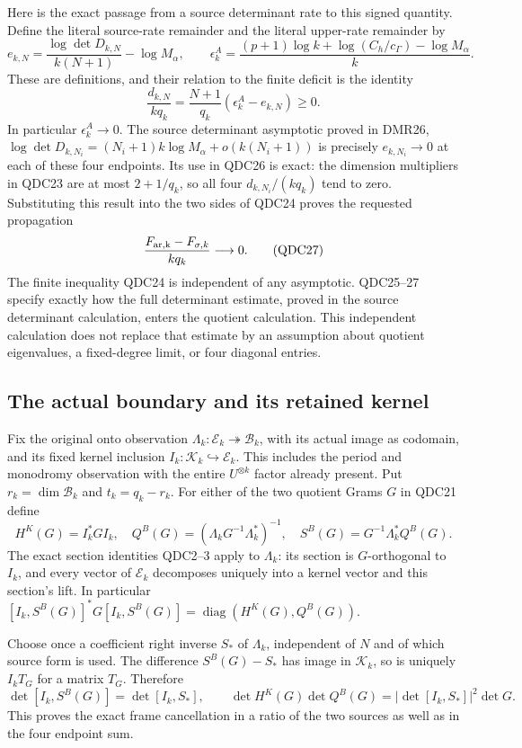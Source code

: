 Here is the exact passage from a source determinant rate to
this signed quantity. Define the literal source-rate remainder
and the literal upper-rate remainder by
\[
 e_{k,N}=\frac{\log\det D_{k,N}}{k(N+1)}-\log M_\alpha,
 \qquad
 \epsilon_k^A=\frac{(p+1)\log k+\log(C_h/c_\Gamma)-\log M_\alpha}{k}.
 \tag{QDC25}
\]
These are definitions, and their relation to the finite
deficit is the identity
\[
 \frac{d_{k,N}}{kq_k}
   =\frac{N+1}{q_k}(\epsilon_k^A-e_{k,N})\ge0.
 \tag{QDC26}
\]
In particular $\epsilon_k^A\to0$. The source determinant asymptotic proved in DMR26,
$\log\det D_{k,N_i}=(N_i+1)k\log M_\alpha+o(k(N_i+1))$
is precisely $e_{k,N_i}\to0$ at each of these four endpoints.
Its use in QDC26 is exact: the dimension multipliers in
QDC23 are at most $2+1/q_k$, so all four
$d_{k,N_i}/(kq_k)$ tend to zero. Substituting this result
into the two sides of QDC24 proves the requested propagation
\[
 \frac{F_{\rm ar,k}-F_{\sigma,k}}{kq_k}\longrightarrow0.
 \tag{QDC27}
\]
The finite inequality QDC24 is independent of any asymptotic.
QDC25--27 specify exactly how the full determinant estimate,
proved in the source determinant calculation, enters the
quotient calculation. This independent calculation does not
replace that estimate by an assumption about quotient
eigenvalues, a fixed-degree limit, or four diagonal entries.

\subsection{The actual boundary and its retained kernel}

Fix the original onto observation
$\Lambda_k:\mathcal E_k\twoheadrightarrow\mathcal B_k$,
with its actual image as codomain, and its fixed kernel
inclusion $I_k:\mathcal K_k\hookrightarrow\mathcal E_k$.
This includes the period and monodromy observation with the
entire $U^{\otimes k}$ factor already present. Put
$r_k=\dim\mathcal B_k$ and $t_k=q_k-r_k$.
For either of the two quotient Grams $G$ in QDC21 define
\[
 H^K(G)=I_k^*GI_k,\quad
 Q^B(G)=(\Lambda_kG^{-1}\Lambda_k^*)^{-1},\quad
 S^B(G)=G^{-1}\Lambda_k^*Q^B(G).
 \tag{QDC28}
\]
The exact section identities QDC2--3 apply to $\Lambda_k$:
its section is $G$-orthogonal to $I_k$, and every vector
of $\mathcal E_k$ decomposes uniquely into a kernel vector
and this section's lift. In particular
$[I_k,S^B(G)]^*G[I_k,S^B(G)]
 =\operatorname{diag}(H^K(G),Q^B(G))$.

Choose once a coefficient right inverse $S_*$ of $\Lambda_k$,
independent of $N$ and of which source form is used.
The difference $S^B(G)-S_*$ has image in $\mathcal K_k$,
so is uniquely $I_kT_G$ for a matrix $T_G$. Therefore
\[
 \det[I_k,S^B(G)]=\det[I_k,S_*],\qquad
 \det H^K(G)\det Q^B(G)
        =|\det[I_k,S_*]|^2\det G.
 \tag{QDC29}
\]
This proves the exact frame cancellation in a ratio of the
two sources as well as in the four endpoint sum.

